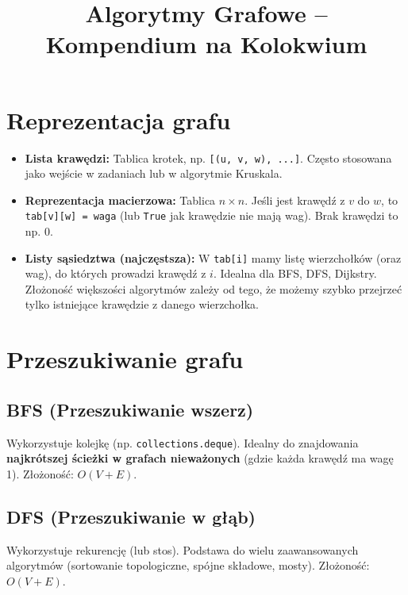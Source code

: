 \documentclass[12pt, a4paper]{article}
\title{\textbf{Algorytmy Grafowe -- Kompendium na Kolokwium}}
\author{}
\date{}
\begin{document}
\maketitle

\section{Reprezentacja grafu}
\begin{itemize}
    \item \textbf{Lista krawędzi:} Tablica krotek, np. \texttt{[(u, v, w), ...]}. Często stosowana jako wejście w zadaniach lub w algorytmie Kruskala.
    \item \textbf{Reprezentacja macierzowa:} Tablica $n \times n$. Jeśli jest krawędź z $v$ do $w$, to \texttt{tab[v][w] = waga} (lub \texttt{True} jak krawędzie nie mają wag). Brak krawędzi to np. $0$.
    \item \textbf{Listy sąsiedztwa (najczęstsza):} W \texttt{tab[i]} mamy listę wierzchołków (oraz wag), do których prowadzi krawędź z $i$. Idealna dla BFS, DFS, Dijkstry. Złożoność większości algorytmów zależy od tego, że możemy szybko przejrzeć tylko istniejące krawędzie z danego wierzchołka.
\end{itemize}

\section{Przeszukiwanie grafu}
\subsection{BFS (Przeszukiwanie wszerz)}
Wykorzystuje kolejkę (np. \texttt{collections.deque}). Idealny do znajdowania \textbf{najkrótszej ścieżki w grafach nieważonych} (gdzie każda krawędź ma wagę 1). Złożoność: $O(V+E)$.

\subsection{DFS (Przeszukiwanie w głąb)}
Wykorzystuje rekurencję (lub stos). Podstawa do wielu zaawansowanych algorytmów (sortowanie topologiczne, spójne składowe, mosty). Złożoność: $O(V+E)$.
\end{document}
